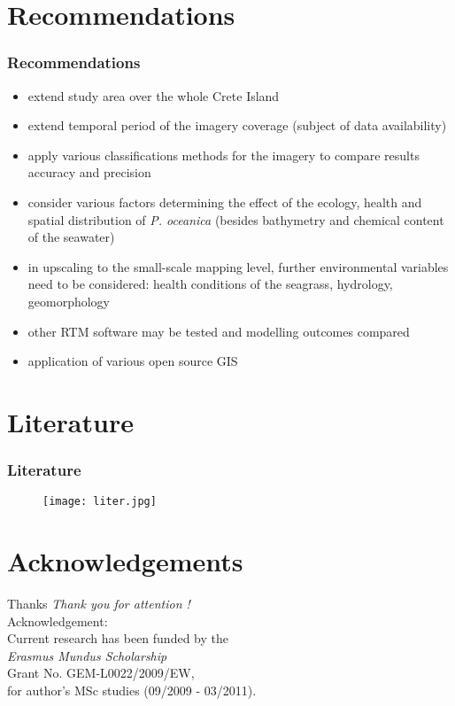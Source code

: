 \documentclass[pdflatex,compress,9pt,
	xcolor={dvipsnames,dvipsnames,svgnames,x11names,table},
	hyperref={colorlinks = true,breaklinks = true, urlcolor = NavyBlue, breaklinks = true}]{beamer}
\begin{document}
\section{Recommendations}
\begin{frame}\frametitle{Recommendations}
\begin{itemize}
	\item extend study area over the whole Crete Island
	\item extend temporal period of the imagery coverage (subject of data availability)
	\item apply various classifications methods for the imagery to compare results accuracy and precision
	\item consider various factors determining the effect of the ecology, health and spatial distribution of \emph{P. oceanica} (besides bathymetry and chemical content of the seawater)
	\item in upscaling to the small-scale mapping level, further environmental variables need to be considered: health conditions of the seagrass, hydrology, geomorphology
	\item other \ac{RTM} software may be tested and modelling outcomes compared
	\item application of various open source \ac{GIS}
\end{itemize}
\end{frame}

\section{Literature}
\begin{frame}\frametitle{Literature}
\begin{figure}[H]
	\centering
		\texttt{[image: liter.jpg]}
\end{figure}
\end{frame}

\section{Acknowledgements}
\begin{frame}{Thanks}
  	\centering \Large 
  	\emph{Thank you for attention !}\\
	\vspace{5em}
\normalsize
Acknowledgement: \\
Current research has been funded by the \\
\emph{Erasmus Mundus Scholarship} \\
Grant No. GEM-L0022/2009/EW, \\
for author's MSc studies (09/2009 - 03/2011).
\end{frame}
\end{document}
